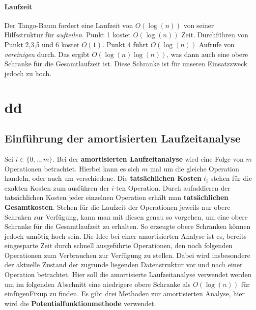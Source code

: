 \documentclass[a4paper,12pt]{article}
\begin{document}
\paragraph{Laufzeit}
Der Tango-Baum fordert eine Laufzeit von $O(\log(n))$ von seiner Hilfsstruktur für \textit{aufteilen}. Punkt 1 kostet $O(\log(n))$ Zeit. Durchführen von Punkt 2,3,5 und 6 kostet $O(1)$. Punkt 4 führt $O(\log (n))$ Aufrufe von \textit{vereinigen} durch. Das ergibt $O(\log (n) \log (n))$, was dann auch eine obere Schranke für die Gesamtlaufzeit ist. Diese Schranke ist für unseren Einsatzzweck jedoch zu hoch.

\section{dd}

\subsection{Einführung der amortisierten Laufzeitanalyse}
Sei $i \in \{0,..,m\}$. Bei der \textbf{amortisierten Laufzeitanalyse} wird eine Folge von $m$ Operationen betrachtet. Hierbei kann es sich $m$ mal um die gleiche Operation handeln, oder auch um verschiedene. Die \textbf{tatsächlichen Kosten}  $t_i$ stehen für die exakten Kosten zum ausführen der $i$-ten Operation. Durch aufaddieren der tatsächlichen Kosten jeder einzelnen Operation erhält man \textbf{tatsächlichen Gesamtkosten}. Stehen für die Laufzeit der Operationen jeweils nur obere Schraken zur Verfügung, kann man mit diesen genau so vorgehen, um eine obere Schranke für die Gesamtlaufzeit zu erhalten. So erzeugte obere Schranken können jedoch unnötig hoch sein. Die Idee bei einer amortisierten Analyse ist es, bereits eingesparte Zeit durch schnell ausgeführte Operationen, den noch folgenden Operationen zum Verbrauchen zur Verfügung zu stellen.  Dabei wird insbesondere der aktuelle Zustand der zugrunde liegenden Datenstruktur vor und nach einer Operation betrachtet. Hier soll die amortisierte Laufzeitanalyse verwendet werden um im folgenden Abschnitt eine niedrigere obere Schranke als $O(\log(n))$ für einfügenFixup zu finden. Es gibt drei Methoden zur amortisierten Analyse, hier wird die \textbf{Potentialfunktionmethode} verwendet.
\end{document}

